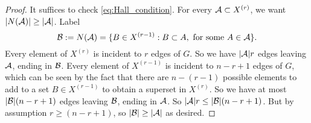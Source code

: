 \begin{proof}	
It suffices to check \ref{eq:Hall_condition}. For every $\mathcal{A}\subset X^{(r)}$, we want $|N(\mathcal{A})| \geq |\mathcal{A}|$. Label
\[
\mathcal{B}:= N(\mathcal{A}) = \{B\in X^{(r-1)}: B\subset A, \text{ for some }A\in \mathcal{A}\}.
\]
Every element of $X^{(r)}$ is incident to $r$ edges of $G$. So we have $|\mathcal{A}|r$ edges leaving $\mathcal{A}$, ending in $\mathcal{B}$.
Every element of $X^{(r-1)}$ is incident to $n-r+1$ edges of $G$, which can be seen by the fact that there are $n-(r-1)$ possible elements to add to a set $B\in X^{(r-1)}$ to obtain a superset in $X^{(r)}$. So we have at most $|\mathcal{B}|(n-r+1)$ edges leaving $\mathcal{B}$, ending in $\mathcal{A}$.
So $|\mathcal{A}|r \leq |\mathcal{B}|(n-r+1)$. But by assumption $r \geq (n-r+1)$, so $|\mathcal{B}| \geq |\mathcal{A}|$ as desired.
\end{proof}


